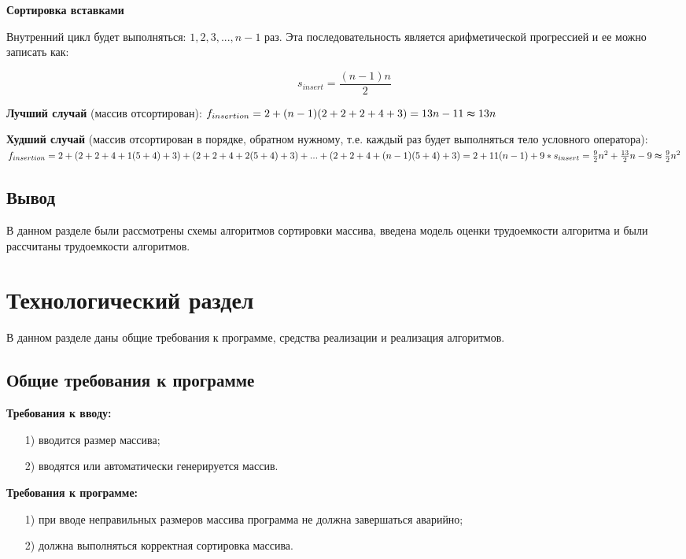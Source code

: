 \documentclass[14pt, a4paper]{extarticle}
\begin{document}
\vspace{\baselineskip}
\noindent\textbf{Сортировка вставками}\par
Внутренний цикл будет выполняться: $1,2,3,...,n-1$ раз. Эта последовательность является арифметической прогрессией и ее можно записать как:\par
\begin{displaymath}
	s_{insert}=\frac{(n-1)n}{2}
\end{displaymath}\par
\textbf{Лучший случай} (массив отсортирован): $f_{insertion}=2+(n-1)(2+2+2+4+3)=13n-11 \thickapprox 13n$\par
\textbf{Худший случай} (массив отсортирован в порядке, обратном нужному, т.е. каждый раз будет выполняться тело условного оператора): $f_{insertion}=2+(2+2+4+1(5+4)+3)+(2+2+4+2(5+4)+3)+...+(2+2+4+(n-1)(5+4)+3) = 2+11(n-1)+9*s_{insert}=\frac{9}{2}n^2+\frac{13}{2}n-9 \thickapprox \frac{9}{2}n^2$\par

\subsection{Вывод}
В данном разделе были рассмотрены схемы алгоритмов сортировки массива, введена модель оценки трудоемкости алгоритма и были рассчитаны трудоемкости алгоритмов.

\clearpage
\section{Технологический раздел}
В данном разделе даны общие требования к программе, средства реализации и реализация алгоритмов.

\subsection{Общие требования к программе}
\textbf{Требования к вводу:}
\begin{enumerate}
	\item[1)] вводится размер массива;
	\item[2)] вводятся или автоматически генерируется массив. 
\end{enumerate}
\textbf{Требования к программе:}
\begin{enumerate}
	\item[1)] при вводе неправильных размеров массива программа не должна завершаться аварийно;
	\item[2)] должна выполняться корректная сортировка массива. 
\end{enumerate}
\end{document}
